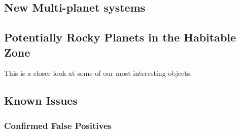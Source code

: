 
\subsection{New Multi-planet systems}
\subsection{Potentially Rocky Planets in the Habitable Zone}
This is a closer look at some of our most interesting objects.
\subsection{Known Issues}
\subsubsection{Confirmed False Positives}
